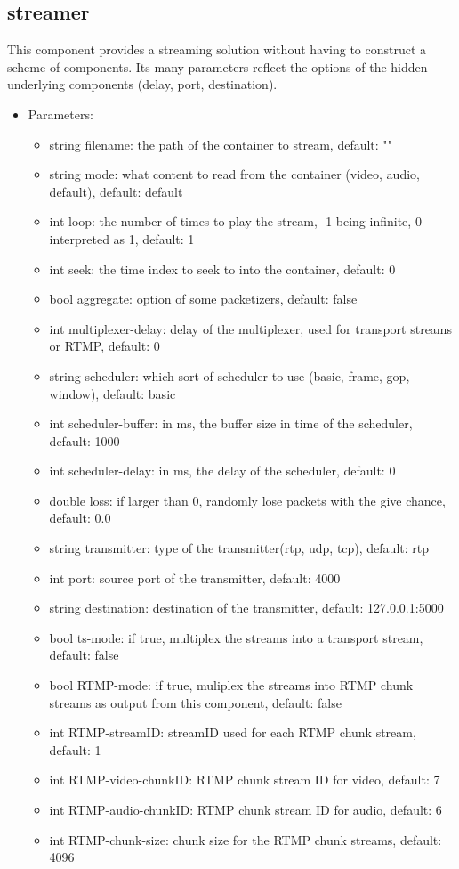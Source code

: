 \subsection{streamer}
This component provides a streaming solution without having to construct a scheme of components. Its many parameters reflect the options of the hidden underlying components (delay, port, destination\textellipsis).
\begin{itemize}
\item Parameters:
\begin{itemize}
\item string filename: the path of the container to stream, default: ""
\item string mode: what content to read from the container (video, audio, default), default: default
\item int loop: the number of times to play the stream, -1 being infinite, 0 interpreted as 1, default: 1
\item int seek: the time index to seek to into the container, default: 0
\item bool aggregate: option of some packetizers, default: false
\item int multiplexer-delay: delay of the multiplexer, used for transport streams or RTMP, default: 0
\item string scheduler: which sort of scheduler to use (basic, frame, gop, window), default: basic
\item int scheduler-buffer: in ms, the buffer size in time of the scheduler, default: 1000
\item int scheduler-delay: in ms, the delay of the scheduler, default: 0
\item double loss: if larger than 0, randomly lose packets with the give chance, default: 0.0
\item string transmitter: type of the transmitter(rtp, udp, tcp), default: rtp
\item int port: source port of the transmitter, default: 4000
\item string destination: destination of the transmitter, default: 127.0.0.1:5000
\item bool ts-mode: if true, multiplex the streams into a transport stream, default: false
\item bool RTMP-mode: if true, muliplex the streams into RTMP chunk streams as output from this component, default: false
\item int RTMP-streamID: streamID used for each RTMP chunk stream, default: 1
\item int RTMP-video-chunkID: RTMP chunk stream ID for video, default: 7
\item int RTMP-audio-chunkID: RTMP chunk stream ID for audio, default: 6
\item int RTMP-chunk-size: chunk size for the RTMP chunk streams, default: 4096
\end{itemize}
\end{itemize}
\newpage
